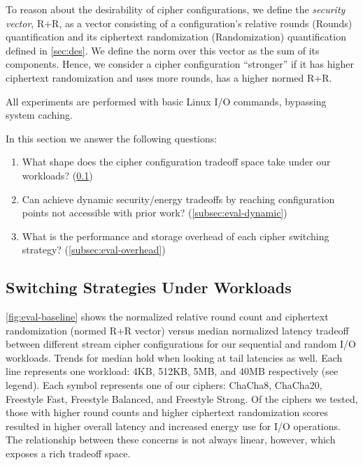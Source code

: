 To reason about the desirability of cipher configurations, we define the
\emph{security vector}, R+R, as a vector consisting of a configuration's
relative rounds (Rounds) quantification and its ciphertext randomization
(Randomization) quantification defined in \cref{sec:des}. We define the norm
over this vector as the sum of its components. Hence, we consider a cipher
configuration ``stronger'' if it has higher ciphertext randomization and uses
more rounds, \ie has a higher normed R+R.

All experiments are performed with basic Linux I/O commands, bypassing system
caching.

In this section we answer the following questions:

\begin{enumerate}
  \item What shape does the cipher configuration tradeoff space take under our
  workloads? (\cref{subsec:eval-baseline})
  \item Can \sys achieve dynamic security/energy tradeoffs by reaching
  configuration points not accessible with prior work?
  (\cref{subsec:eval-dynamic})
  \item What is the performance and storage overhead of each cipher switching
  strategy? (\cref{subsec:eval-overhead})
\end{enumerate}


\subsection{Switching Strategies Under Workloads}\label{subsec:eval-baseline}



\cref{fig:eval-baseline} shows the normalized relative round count and
ciphertext randomization (normed R+R vector) versus median normalized latency
tradeoff between different stream cipher configurations for our sequential and
random I/O workloads. Trends for median hold when looking at tail latencies as
well. Each line represents one workload: 4KB, 512KB, 5MB, and 40MB respectively
(see legend). Each symbol represents one of our ciphers: ChaCha8, ChaCha20,
Freestyle Fast, Freestyle Balanced, and Freestyle Strong. Of the ciphers we
tested, those with higher round counts and higher ciphertext randomization
scores resulted in higher overall latency and increased energy use for I/O
operations. The relationship between these concerns is not always linear,
however, which exposes a rich tradeoff space.

